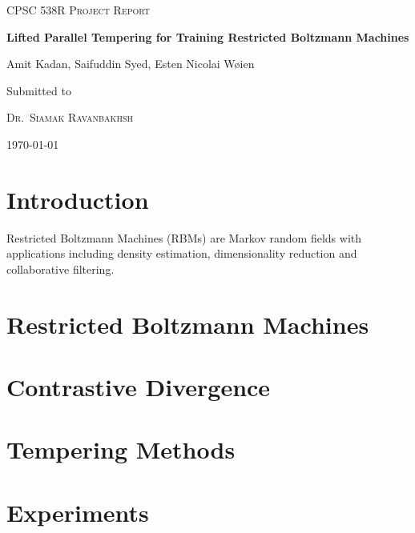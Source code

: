 \documentclass[12pt]{article}
\begin{document}
\begin{titlepage}
	\centering
	
	{\scshape \Large CPSC 538R Project Report
\par}
	\vspace{1cm}
	{\huge\bfseries Lifted Parallel Tempering for Training Restricted Boltzmann Machines
\par}
	\vspace{0.5cm}
	{\Large  Amit Kadan, Saifuddin Syed, Esten Nicolai W{\o}ien
\par}

	\vfill
	Submitted to\par
	{\scshape Dr.~Siamak Ravanbakhsh}\\
		{ \today\par}



\end{titlepage}

\tableofcontents
\newpage

\section{Introduction}
Restricted Boltzmann Machines (RBMs) are Markov random fields with applications including density estimation, 
dimensionality reduction and collaborative filtering.

\section{Restricted Boltzmann Machines}


\section{Contrastive Divergence}

\section{Tempering Methods}

\section{Experiments}

 

\end{document}
